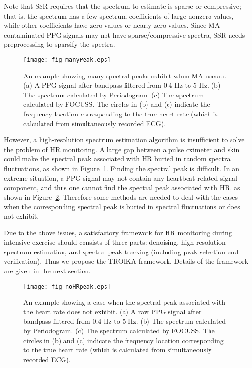 \documentclass[10pt,twocolumn]{IEEEtran}
\begin{document}
Note that SSR requires that the spectrum to estimate is sparse or compressive; that is, the spectrum has a few spectrum coefficients of large nonzero values, while other coefficients have zero values or nearly zero values.
Since MA-contaminated PPG signals may not have sparse/compressive spectra, SSR needs preprocessing to sparsify the spectra.

\begin{figure}[t]
\centering
\texttt{[image: fig\_manyPeak.eps]}
\caption{An example showing many spectral peaks exhibit when MA occurs. (a) A PPG signal after bandpass filtered from 0.4 Hz to 5 Hz. (b) The spectrum calculated by Periodogram. (c) The spectrum calculated by FOCUSS. The circles in (b) and (c) indicate the frequency location corresponding to the true heart rate (which is calculated from simultaneously recorded ECG).}
\label{fig:manyPeak}
\end{figure}


However, a high-resolution spectrum estimation algorithm is insufficient to solve the problem of HR monitoring. A large gap between a pulse oximeter and skin could make the spectral peak associated with HR buried in random spectral fluctuations, as shown in  Figure~\ref{fig:manyPeak}. Finding the spectral peak is difficult. In an extreme situation, a PPG signal may not contain any heartbeat-related signal component, and thus one cannot find the spectral peak associated with HR, as shown in Figure~\ref{fig:noHRpeak}. Therefore some methods are needed to deal with the cases when the corresponding spectral peak is buried in spectral fluctuations or does not exhibit.



Due to the above issues,  a satisfactory framework for HR monitoring during intensive exercise should consists of three parts: denoising, high-resolution spectrum estimation, and spectral peak tracking (including peak selection and verification). Thus we propose the TROIKA framework. Details of the framework are given in the next section.




\begin{figure}[t]
\centering
\texttt{[image: fig\_noHRpeak.eps]}
\caption{An example showing a case when the spectral peak associated with the heart rate does not exhibit. (a) A raw PPG signal after bandpass filtered from 0.4 Hz to 5 Hz. (b) The spectrum calculated by Periodogram. (c) The spectrum calculated by FOCUSS. The circles in (b) and (c) indicate the frequency location corresponding to the true heart rate (which is calculated from simultaneously recorded ECG).}
\label{fig:noHRpeak}
\end{figure}
\end{document}
